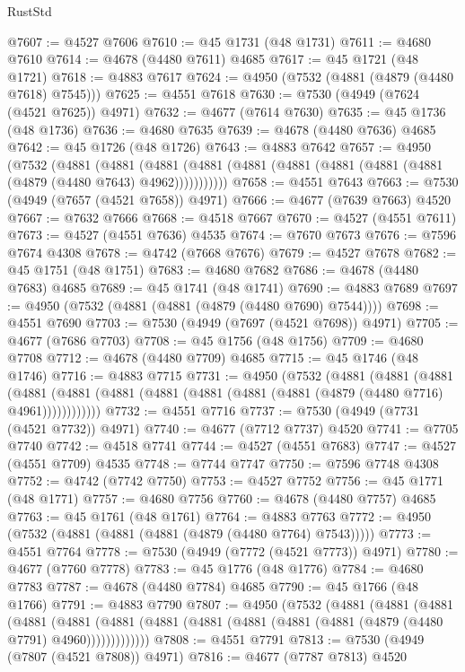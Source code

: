 \begin{lexlean}{RustStd}
\begin{coremodule}
@7607 := @4527 @7606
@7610 := @45 @1731 (@48 @1731)
@7611 := @4680 @7610
@7614 := @4678 (@4480 @7611) @4685
@7617 := @45 @1721 (@48 @1721)
@7618 := @4883 @7617
@7624 := @4950 (@7532 (@4881 (@4879 (@4480 @7618) @7545)))
@7625 := @4551 @7618
@7630 := @7530 (@4949 (@7624 (@4521 @7625)) @4971)
@7632 := @4677 (@7614 @7630)
@7635 := @45 @1736 (@48 @1736)
@7636 := @4680 @7635
@7639 := @4678 (@4480 @7636) @4685
@7642 := @45 @1726 (@48 @1726)
@7643 := @4883 @7642
@7657 := @4950
    (@7532
      (@4881
        (@4881
          (@4881 (@4881 (@4881 (@4881 (@4881 (@4881 (@4881 (@4879 (@4480 @7643) @4962)))))))))))
@7658 := @4551 @7643
@7663 := @7530 (@4949 (@7657 (@4521 @7658)) @4971)
@7666 := @4677 (@7639 @7663) @4520
@7667 := @7632 @7666
@7668 := @4518 @7667
@7670 := @4527 (@4551 @7611)
@7673 := @4527 (@4551 @7636) @4535
@7674 := @7670 @7673
@7676 := @7596 @7674 @4308
@7678 := @4742 (@7668 @7676)
@7679 := @4527 @7678
@7682 := @45 @1751 (@48 @1751)
@7683 := @4680 @7682
@7686 := @4678 (@4480 @7683) @4685
@7689 := @45 @1741 (@48 @1741)
@7690 := @4883 @7689
@7697 := @4950 (@7532 (@4881 (@4881 (@4879 (@4480 @7690) @7544))))
@7698 := @4551 @7690
@7703 := @7530 (@4949 (@7697 (@4521 @7698)) @4971)
@7705 := @4677 (@7686 @7703)
@7708 := @45 @1756 (@48 @1756)
@7709 := @4680 @7708
@7712 := @4678 (@4480 @7709) @4685
@7715 := @45 @1746 (@48 @1746)
@7716 := @4883 @7715
@7731 := @4950
    (@7532
      (@4881
        (@4881
          (@4881
            (@4881 (@4881 (@4881 (@4881 (@4881 (@4881 (@4881 (@4879 (@4480 @7716) @4961))))))))))))
@7732 := @4551 @7716
@7737 := @7530 (@4949 (@7731 (@4521 @7732)) @4971)
@7740 := @4677 (@7712 @7737) @4520
@7741 := @7705 @7740
@7742 := @4518 @7741
@7744 := @4527 (@4551 @7683)
@7747 := @4527 (@4551 @7709) @4535
@7748 := @7744 @7747
@7750 := @7596 @7748 @4308
@7752 := @4742 (@7742 @7750)
@7753 := @4527 @7752
@7756 := @45 @1771 (@48 @1771)
@7757 := @4680 @7756
@7760 := @4678 (@4480 @7757) @4685
@7763 := @45 @1761 (@48 @1761)
@7764 := @4883 @7763
@7772 := @4950 (@7532 (@4881 (@4881 (@4881 (@4879 (@4480 @7764) @7543)))))
@7773 := @4551 @7764
@7778 := @7530 (@4949 (@7772 (@4521 @7773)) @4971)
@7780 := @4677 (@7760 @7778)
@7783 := @45 @1776 (@48 @1776)
@7784 := @4680 @7783
@7787 := @4678 (@4480 @7784) @4685
@7790 := @45 @1766 (@48 @1766)
@7791 := @4883 @7790
@7807 := @4950
    (@7532
      (@4881
        (@4881
          (@4881
            (@4881
              (@4881
                (@4881 (@4881 (@4881 (@4881 (@4881 (@4881 (@4879 (@4480 @7791) @4960)))))))))))))
@7808 := @4551 @7791
@7813 := @7530 (@4949 (@7807 (@4521 @7808)) @4971)
@7816 := @4677 (@7787 @7813) @4520

\end{coremodule}
\end{lexlean}
